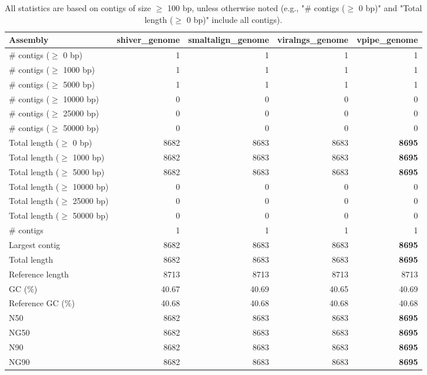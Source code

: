 \documentclass[12pt,a4paper]{article}
\begin{document}
\begin{table}[ht]
\begin{center}
\caption{All statistics are based on contigs of size $\geq$ 100 bp, unless otherwise noted (e.g., "\# contigs ($\geq$ 0 bp)" and "Total length ($\geq$ 0 bp)" include all contigs).}
\begin{tabular}{|l*{4}{|r}|}
\hline
Assembly & shiver\_genome & smaltalign\_genome & viralngs\_genome & vpipe\_genome \\ \hline
\# contigs ($\geq$ 0 bp) & 1 & 1 & 1 & 1 \\ \hline
\# contigs ($\geq$ 1000 bp) & 1 & 1 & 1 & 1 \\ \hline
\# contigs ($\geq$ 5000 bp) & 1 & 1 & 1 & 1 \\ \hline
\# contigs ($\geq$ 10000 bp) & 0 & 0 & 0 & 0 \\ \hline
\# contigs ($\geq$ 25000 bp) & 0 & 0 & 0 & 0 \\ \hline
\# contigs ($\geq$ 50000 bp) & 0 & 0 & 0 & 0 \\ \hline
Total length ($\geq$ 0 bp) & 8682 & 8683 & 8683 & {\bf 8695} \\ \hline
Total length ($\geq$ 1000 bp) & 8682 & 8683 & 8683 & {\bf 8695} \\ \hline
Total length ($\geq$ 5000 bp) & 8682 & 8683 & 8683 & {\bf 8695} \\ \hline
Total length ($\geq$ 10000 bp) & 0 & 0 & 0 & 0 \\ \hline
Total length ($\geq$ 25000 bp) & 0 & 0 & 0 & 0 \\ \hline
Total length ($\geq$ 50000 bp) & 0 & 0 & 0 & 0 \\ \hline
\# contigs & 1 & 1 & 1 & 1 \\ \hline
Largest contig & 8682 & 8683 & 8683 & {\bf 8695} \\ \hline
Total length & 8682 & 8683 & 8683 & {\bf 8695} \\ \hline
Reference length & 8713 & 8713 & 8713 & 8713 \\ \hline
GC (\%) & 40.67 & 40.69 & 40.65 & 40.69 \\ \hline
Reference GC (\%) & 40.68 & 40.68 & 40.68 & 40.68 \\ \hline
N50 & 8682 & 8683 & 8683 & {\bf 8695} \\ \hline
NG50 & 8682 & 8683 & 8683 & {\bf 8695} \\ \hline
N90 & 8682 & 8683 & 8683 & {\bf 8695} \\ \hline
NG90 & 8682 & 8683 & 8683 & {\bf 8695} \\ \hline

\end{tabular}
\end{center}
\end{table}
\end{document}
